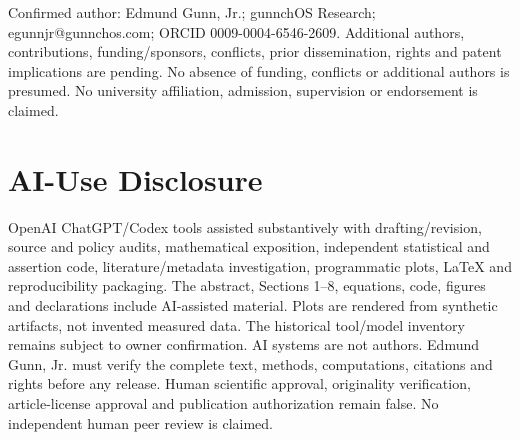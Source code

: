 \documentclass[10pt,twocolumn]{article}
\begin{document}
Confirmed author: Edmund Gunn, Jr.; gunnchOS Research; egunnjr@gunnchos.com; ORCID 0009-0004-6546-2609. Additional authors, contributions, funding/sponsors, conflicts, prior dissemination, rights and patent implications are pending. No absence of funding, conflicts or additional authors is presumed. No university affiliation, admission, supervision or endorsement is claimed.

\section*{AI-Use Disclosure}
OpenAI ChatGPT/Codex tools assisted substantively with drafting/revision, source and policy audits, mathematical exposition, independent statistical and assertion code, literature/metadata investigation, programmatic plots, LaTeX and reproducibility packaging. The abstract, Sections 1--8, equations, code, figures and declarations include AI-assisted material. Plots are rendered from synthetic artifacts, not invented measured data. The historical tool/model inventory remains subject to owner confirmation. AI systems are not authors. Edmund Gunn, Jr. must verify the complete text, methods, computations, citations and rights before any release. Human scientific approval, originality verification, article-license approval and publication authorization remain false. No independent human peer review is claimed.



\end{document}
